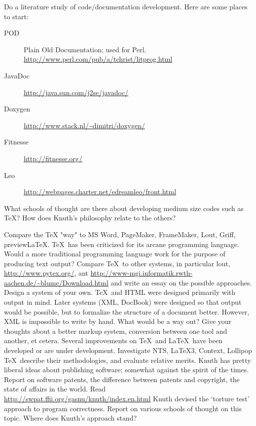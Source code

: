 \project Do a literature study of code/documentation development. Here are some
places to start:
\begin{description}
\item[POD] Plain Old Documentation; used for
  Perl. \url{http://www.perl.com/pub/a/tchrist/litprog.html}
\item[JavaDoc] \url{http://java.sun.com/j2se/javadoc/}
\item[Doxygen] \url{http://www.stack.nl/~dimitri/doxygen/}
\item[Fitnesse] \url{http://fitnesse.org/}
\item[Leo] \url{http://webpages.charter.net/edreamleo/front.html}
\end{description}
What schools of
thought are there about developing medium size codes such as \TeX? How
does Knuth's philosophy relate to the others?
%
%
%
\begin{comment}
\project
Design a general model for tables and write software that formats
tables. You can output \TeX\ macros, or argue why they aren't powerful
enough, and design a better language for describing tables.
\end{comment}
%
%
%
\project Compare the TeX "way" to MS Word, PageMaker, FrameMaker,
Lout, Griff, previewLaTeX.
%
%
%
\project \TeX\ has been criticized for its arcane programming
language. Would a more traditional programming language work for the
purpose of producing text output? Compare \TeX\ to other systems, in
particular lout, \url{http://www.pytex.org/}, ant
\url{http://www-mgi.informatik.rwth-aachen.de/~blume/Download.html}
and write an essay on the possible approaches. Design a system of your own.
%
%
%
\project \TeX\ and HTML were designed primarily with output in
mind. Later systems (XML, DocBook) were designed so that output would
be possible, but to formalize the structure of a document better.
However, XML is impossible to write by hand. What would be a way out?
Give your thoughts about a better markup system, conversion between
one tool and another, et cetera.
%
%
%
\project Several improvements on \TeX\ and \LaTeX\ have been developed
or are under development. Investigate NTS, LaTeX3, Context, Lollipop
\TeX\, describe their methodologies, and evaluate relative merits.
\project Knuth has pretty liberal ideas about publishing software;
somewhat against the spirit of the times. Report on software patents,
the difference between patents and copyright, the state of affairs in
the world. Read \url{http://swpat.ffii.org/gasnu/knuth/index.en.html}
%
%
%
\project Knuth devised the `torture test' approach to program correctness. 
Report on various schools of thought on this topic. Where does Knuth's 
approach stand?
